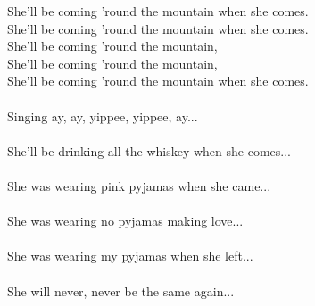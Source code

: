 \vspace{10pt}
She'll be coming 'round the mountain when she comes.\\
She'll be coming 'round the mountain when she comes.\\
She'll be coming 'round the mountain,\\
She'll be coming 'round the mountain,\\
She'll be coming 'round the mountain when she comes.\\
\\
Singing ay, ay, yippee, yippee, ay...\\
\\
She'll be drinking all the whiskey when she comes...\\
\\
She was wearing pink pyjamas when she came...\\
\\
She was wearing no pyjamas making love...\\
\\
She was wearing my pyjamas when she left...\\
\\
She will never, never be the same again...
